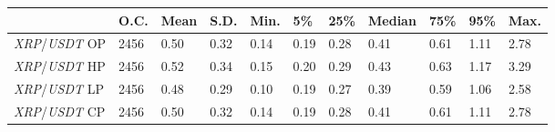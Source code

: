 \begin{tabular}{lllllllllll}
\toprule
 & \textbf{O.C.} & \textbf{Mean} & \textbf{S.D.} & \textbf{Min.} & \textbf{5\%} & \textbf{25\%} & \textbf{Median} & \textbf{75\%} & \textbf{95\%} & \textbf{Max.} \\
\midrule
\emph{XRP}/\emph{USDT} OP & 2456 & 0.50 & 0.32 & 0.14 & 0.19 & 0.28 & 0.41 & 0.61 & 1.11 & 2.78 \\
\emph{XRP}/\emph{USDT} HP & 2456 & 0.52 & 0.34 & 0.15 & 0.20 & 0.29 & 0.43 & 0.63 & 1.17 & 3.29 \\
\emph{XRP}/\emph{USDT} LP & 2456 & 0.48 & 0.29 & 0.10 & 0.19 & 0.27 & 0.39 & 0.59 & 1.06 & 2.58 \\
\emph{XRP}/\emph{USDT} CP & 2456 & 0.50 & 0.32 & 0.14 & 0.19 & 0.28 & 0.41 & 0.61 & 1.11 & 2.78 \\
\bottomrule
\end{tabular}
